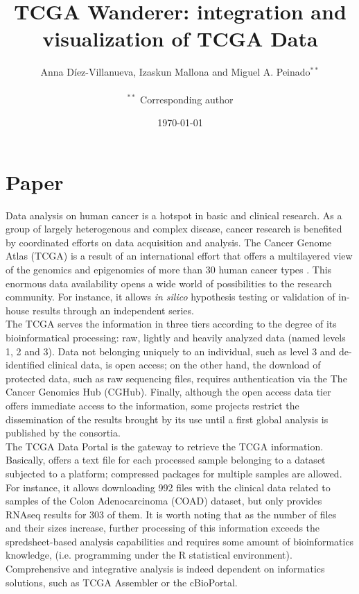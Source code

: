 \documentclass{article}
\title{TCGA Wanderer: integration and visualization of TCGA Data}
\author{Anna D{\'i}ez-Villanueva, Izaskun Mallona and Miguel A. Peinado$^{**}$ \\
\\
 $^{**}$ Corresponding author
}
\date{\today}
\begin{document}
\maketitle

\section{Paper}

Data analysis on human cancer is a hotspot in basic and clinical research. As a group of largely heterogenous and complex disease, cancer research is benefited by coordinated efforts on data acquisition and analysis. The Cancer Genome Atlas (TCGA) is a result of an international effort that offers a multilayered view of the genomics and epigenomics of more than 30 human cancer types \cite{weinstein2013cancer}. This enormous data availability opens a wide world of possibilities to the research community. For instance, it allows \textit{in silico} hypothesis testing or validation of in-house results through an independent series.\\

The TCGA serves the information in three tiers according to the degree of its bioinformatical processing: raw, lightly and heavily analyzed data (named levels 1, 2 and 3). Data not belonging uniquely to an individual, such as level 3 and de-identified clinical data, is open access; on the other hand, the download of protected data, such as raw sequencing files, requires authentication via the The Cancer Genomics Hub (CGHub)\cite{wilks2014cancer}. Finally, although the open access data tier offers immediate access to the information, some projects restrict the dissemination of the results brought by its use until a first global analysis is published by the consortia.\\

The TCGA Data Portal is the gateway to retrieve the TCGA information. Basically, offers a text file for each processed sample belonging to a dataset subjected to a platform; compressed packages for multiple samples are allowed. For instance, it allows downloading 992 files with the clinical data related to samples of the Colon Adenocarcinoma (COAD) dataset, but only provides RNAseq results for 303 of them. It is worth noting that as the number of files and their sizes increase, further processing of this information exceeds the spredsheet-based analysis capabilities and requires some amount of bioinformatics knowledge, (i.e. programming under the R statistical environment). Comprehensive and integrative analysis is indeed dependent on informatics solutions, such as TCGA Assembler \cite{zhu2014tcga} or the cBioPortal\cite{gao2013integrative}.\\
\end{document}
